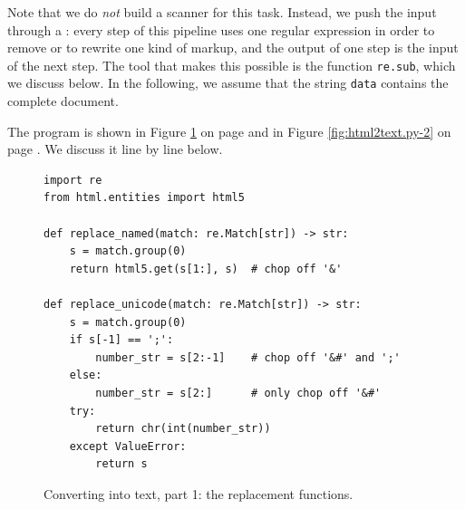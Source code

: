 \noindent
Note that we do \emph{not} build a scanner for this task.  Instead, we push the input through a
: every step of this pipeline uses one regular
expression in order to remove or to rewrite one kind of markup, and the output of one step is the input of the
next step.  The tool that makes this possible is the function \texttt{re.sub}, which we discuss below.  In the
following, we assume that the string \texttt{data} contains the complete  document.

The program is shown in Figure \ref{fig:html2text.py-1} on page \pageref{fig:html2text.py-1} and in Figure
\ref{fig:html2text.py-2} on page \pageref{fig:html2text.py-2}.  We discuss it line by line below.

\begin{figure}[!ht]
\centering
  \begin{verbatim}
import re
from html.entities import html5

def replace_named(match: re.Match[str]) -> str:
    s = match.group(0)
    return html5.get(s[1:], s)  # chop off '&'

def replace_unicode(match: re.Match[str]) -> str:
    s = match.group(0)
    if s[-1] == ';':
        number_str = s[2:-1]    # chop off '&#' and ';'
    else:
        number_str = s[2:]      # only chop off '&#'
    try:
        return chr(int(number_str))
    except ValueError:
        return s
\end{verbatim}
\vspace*{-0.3cm}
\caption{Converting  into text, part 1: the replacement functions.}
\label{fig:html2text.py-1}
\end{figure}

